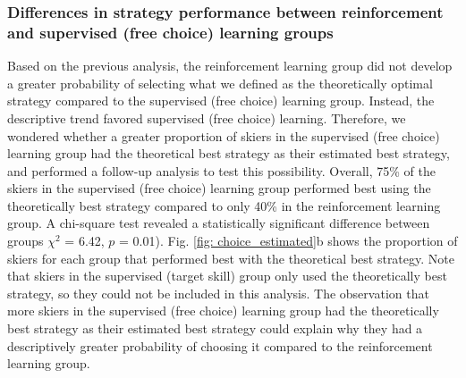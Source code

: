 \documentclass[pdflatex,sn-nature]{sn-jnl}%
\theoremstyle{thmstyleone}%
\theoremstyle{thmstyletwo}%
\theoremstyle{thmstylethree}%
\begin{document}
\subsubsection{Differences in strategy performance between reinforcement  and supervised (free choice) learning groups}\label{result_strategychoice_prop}
Based on the previous analysis, the reinforcement learning group  did not develop a greater probability of selecting what we defined as the theoretically optimal strategy compared to the supervised (free choice) learning group. Instead, the descriptive trend favored supervised (free choice) learning. Therefore, we wondered whether a greater proportion of skiers in the supervised (free choice) learning group had the theoretical best strategy as their estimated best strategy, and performed a follow-up analysis to test this possibility. Overall, 75\% of the skiers in the supervised (free choice) learning group performed best using the theoretically best strategy compared to only 40\% in the reinforcement learning group. A chi-square test revealed a statistically significant difference between groups $\chi^2$ = 6.42, $p$ = 0.01). Fig. \ref{fig: choice_estimated}b shows the proportion of skiers for each group that performed best with the theoretical best strategy. Note that skiers in the supervised (target skill) group only used the theoretically best strategy, so they could not be included in this analysis. The observation that more skiers in the supervised (free choice) learning group had the theoretically best strategy as their estimated best strategy could explain why they had a descriptively greater probability of choosing it compared to the reinforcement learning group. 
\end{document}
